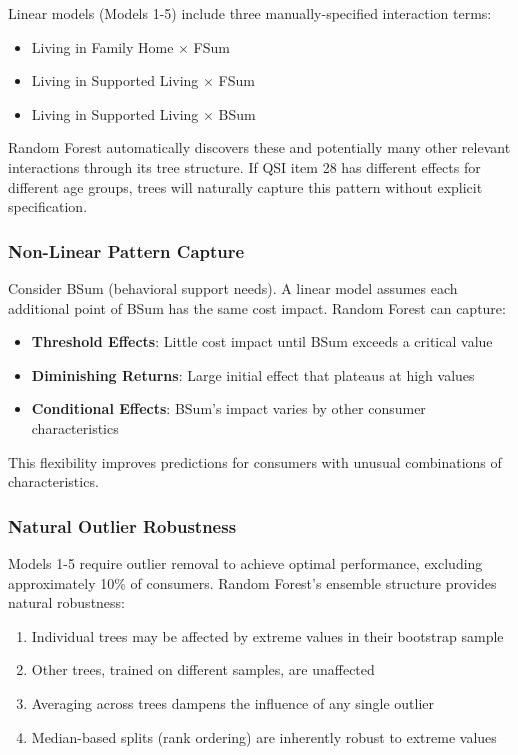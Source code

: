 Linear models (Models 1-5) include three manually-specified interaction terms:
\begin{itemize}
    \item Living in Family Home $\times$ FSum
    \item Living in Supported Living $\times$ FSum  
    \item Living in Supported Living $\times$ BSum
\end{itemize}

Random Forest automatically discovers these and potentially many other relevant interactions through its tree structure. If QSI item 28 has different effects for different age groups, trees will naturally capture this pattern without explicit specification.

\subsubsection{Non-Linear Pattern Capture}

Consider BSum (behavioral support needs). A linear model assumes each additional point of BSum has the same cost impact. Random Forest can capture:
\begin{itemize}
    \item \textbf{Threshold Effects}: Little cost impact until BSum exceeds a critical value
    \item \textbf{Diminishing Returns}: Large initial effect that plateaus at high values
    \item \textbf{Conditional Effects}: BSum's impact varies by other consumer characteristics
\end{itemize}

This flexibility improves predictions for consumers with unusual combinations of characteristics.

\subsubsection{Natural Outlier Robustness}

Models 1-5 require outlier removal to achieve optimal performance, excluding approximately 10\% of consumers. Random Forest's ensemble structure provides natural robustness:

\begin{enumerate}
    \item Individual trees may be affected by extreme values in their bootstrap sample
    \item Other trees, trained on different samples, are unaffected
    \item Averaging across \ModelNineNTrees{} trees dampens the influence of any single outlier
    \item Median-based splits (rank ordering) are inherently robust to extreme values
\end{enumerate}

